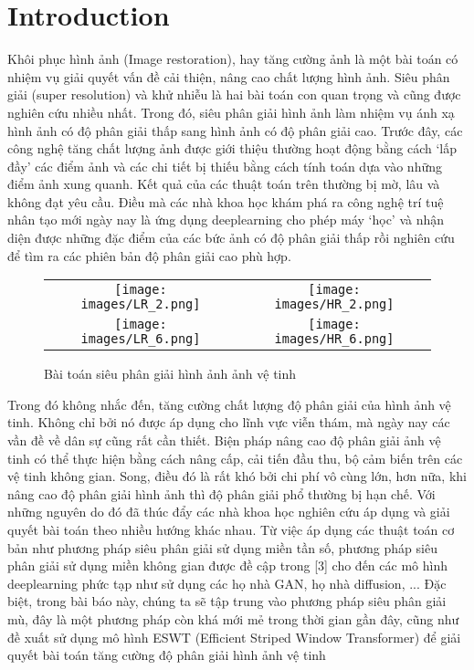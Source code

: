 \documentclass[conference]{IEEEtran}
\begin{document}
\section{Introduction}
Khôi phục hình ảnh (Image restoration), hay tăng cường ảnh là một bài toán có nhiệm vụ giải quyết vấn đề cải thiện, nâng cao chất lượng hình ảnh. Siêu phân giải (super resolution) và khử nhiễu là hai bài toán con quan trọng và cũng được nghiên cứu nhiều nhất. Trong đó, siêu phân giải hình ảnh làm nhiệm vụ ánh xạ hình ảnh có độ phân giải thấp sang hình ảnh có độ phân giải cao. Trước đây, các công nghệ tăng chất lượng ảnh được giới thiệu thường hoạt động bằng cách ‘lấp đầy’ các điểm ảnh và các chi tiết bị thiếu bằng cách tính toán dựa vào những điểm ảnh xung quanh. Kết quả của các thuật toán trên thường bị mờ, lâu và không đạt yêu cầu. Điều mà các nhà khoa học khám phá ra công nghệ trí tuệ nhân tạo mới ngày nay là ứng dụng deeplearning cho phép máy ‘học’ và nhận diện được những đặc điểm của các bức ảnh có độ phân giải thấp rồi nghiên cứu để tìm ra các phiên bản độ phân giải cao phù hợp.

\begin{figure}[h] \label{fig:three-alternative-operations}
    \begin{tabular}{cc}
        \texttt{[image: images/LR\_2.png]} &
        \texttt{[image: images/HR\_2.png]} \\
        \texttt{[image: images/LR\_6.png]} &
        \texttt{[image: images/HR\_6.png]} \\
    \end{tabular}
    \caption{Bài toán siêu phân giải hình ảnh ảnh vệ tinh}
\end{figure}

Trong đó không nhắc đến, tăng cường chất lượng độ phân giải của hình ảnh vệ tinh. Không chỉ bởi nó được áp dụng cho lĩnh vực viễn thám, mà ngày nay các vần đề về dân sự cũng rất cần thiết. Biện pháp nâng cao độ phân giải ảnh vệ tinh có thể thực hiện bằng cách nâng cấp, cải tiến đầu thu, bộ cảm biến trên các vệ tinh không gian. Song, điều đó là rất khó bởi chi phí vô cùng lớn, hơn nữa, khi nâng cao độ phân giải hình ảnh thì độ phân giải phổ thường bị hạn chế. Với những nguyên do đó đã thúc đẩy các nhà khoa học nghiên cứu áp dụng và giải quyết bài toán theo nhiều hướng khác nhau. Từ việc áp dụng các thuật toán cơ bản như phương pháp siêu phân giải sử dụng miền tần số, phương pháp siêu phân giải sử dụng miền không gian được đề cập trong [3] cho đến các mô hình deeplearning phức tạp như sử dụng các họ nhà GAN, họ nhà diffusion, ... Đặc biệt, trong bài báo này, chúng ta sẽ tập trung vào phương pháp siêu phân giải mù, đây là một phương pháp
còn khá mới mẻ trong thời gian gần đây, cũng như đề xuất sử dụng mô hình ESWT (Efficient Striped Window Transformer) để giải quyết bài toán tăng cường độ phân giải hình ảnh vệ tinh
\end{document}
